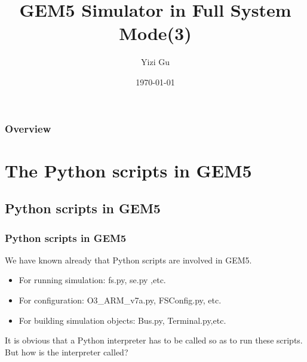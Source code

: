 \documentclass{beamer}
\title[Group Meeting Talk]{GEM5 Simulator in Full System Mode(3)} %
\author{Yizi Gu} %
\institute[Department of EE,THU] %
{
Tsinghua University\\ %
\medskip
\textit{yizigu@gmail.com} %
}
\date{\today} %
\begin{document}
\begin{frame}
\titlepage %
\end{frame}

\begin{frame}
\frametitle{Overview} %
\tableofcontents %
\end{frame}


\section{The Python scripts in GEM5} %
\subsection{Python scripts in GEM5}
\begin{frame}
\frametitle{Python scripts in GEM5}
We have known already that Python scripts are involved in GEM5. 

\begin{example}
    \begin{itemize}
	\item For running simulation: fs.py, se.py ,etc.
	\item For configuration: O3\_ARM\_v7a.py, FSConfig.py, etc.
	\item For building simulation objects: Bus.py, Terminal.py,etc.
    \end{itemize}
\end{example}
It is obvious that a Python interpreter has to be called so as to run these scripts. But how is the interpreter called?
\end{frame}
\end{document}
